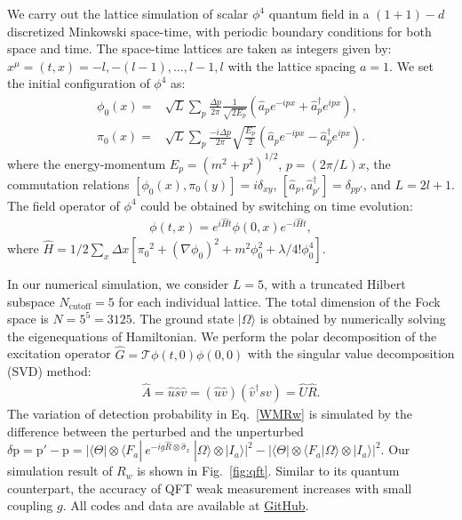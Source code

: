 \documentclass[twocolumn,pra,aps,superscriptaddress]{revtex4-2}
\begin{document}
We carry out the lattice simulation of scalar $\phi^4$ quantum field in a $(1+1)-d$ discretized  Minkowski space-time, with periodic boundary conditions for both space and time. The space-time lattices are taken as integers given by: $x^\mu = (t,x) = -l, -(l-1), \ldots, l-1, l$ with the lattice spacing $a=1$. We set the initial configuration of $\phi^4$ as:
\begin{align}
\phi_0(x) =& \sqrt{L}\sum_p\frac{\Delta p}{2\pi} \frac{1}{\sqrt{2E_{p}}} \left(  \hat{a}_{p}e^{-ip x} +\hat{a}^{\dagger}_{p}e^{ip x}  \right),\\
\pi_0(x) =& \sqrt{L}\sum_p \frac{-i\Delta p}{2\pi}\sqrt{ \frac{E_{p}}{2}} \left(  \hat{a}_{p}e^{-ip x} -\hat{a}^{\dagger}_{p}e^{ip x}  \right).
\end{align}
where the energy-momentum $E_p={(m^2+p^2)}^{1/2}$, $p = ({2\pi}/{L})x$, the commutation relations $\left[\phi_0(x),\pi_0(y)\right]=i\delta_{xy}$, $\left[\hat{a}_{p},\hat{a}^{\dagger}_{p'} \right]=\delta_{pp'}$, and $L=2l+1$. The field operator of $\phi^4$ could be obtained by switching on time evolution: 
\begin{align}
\phi(t,x) = e^{i\hat{H}t}\phi(0,x)e^{-i\hat{H}t},
\end{align}
where $\hat{H} =1/2 \sum_{x}\Delta x \left[ {\pi_0}^2 + (\nabla \phi_0)^2 +m^2\phi_0^2 + \lambda / {4!} \phi_0^4 \right]$. 

In our numerical simulation, we consider $L=5$, with a truncated Hilbert subspace $N_{\text{cutoff}}=5$ for each individual lattice. The total dimension of the Fock space is $N=5^5=3125$. The ground state $|\Omega\rangle$ is obtained by numerically solving the eigenequations of Hamiltonian. We perform the polar decomposition of the excitation operator $\hat{G}=\mathcal{T} \phi(t,0) \phi(0,0)$ with the singular value decomposition (SVD) method: 
\begin{align}
\hat{A}=\hat{u}\hat{s}\hat{v}=(\hat{u}\hat{v} )(\hat{v}^\dagger sv )=\hat{U}\hat{R}.
\end{align} 
The variation of detection probability in Eq.~\eqref{WMRw} is simulated by the difference between the perturbed and the unperturbed $\delta \text{p} = \text{p}' - \text{p} = |\langle \Theta|\otimes \langle F_a|~e^{-ig\hat{R}\otimes\hat{\sigma}_x}~|\Omega\rangle\otimes| I_a\rangle|^2- |\langle \Theta|\otimes \langle F_a|\Omega\rangle\otimes| I_a\rangle|^2$. Our simulation result of $R_w$ is shown in Fig.~\ref{fig:qft}. Similar to its quantum counterpart, the accuracy of QFT weak measurement increases with small coupling $g$. All codes and data are available at \href{https://github.com/GnefnAuy/GF-WV}{GitHub}.
\end{document}
